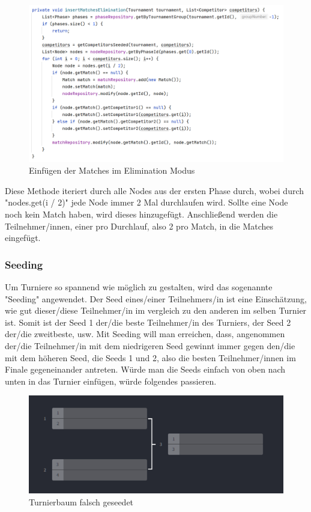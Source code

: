\begin{figure}[H]
    \includegraphics[scale=0.48]{pics/backend/elimination/elimination_insertMatches.png}
    \caption{Einfügen der Matches im Elimination Modus}
\end{figure}

Diese Methode iteriert durch alle Nodes aus der ersten Phase durch, wobei durch "nodes.get(i / 2)" jede Node immer 2 Mal durchlaufen wird. 
Sollte eine Node noch kein Match haben, wird dieses hinzugefügt. Anschließend werden die Teilnehmer/innen, einer pro Durchlauf, also 2 pro Match, 
in die Matches eingefügt. 

\subsubsection{Seeding}

Um Turniere so spannend wie möglich zu gestalten, wird das sogenannte "Seeding" angewendet. Der Seed eines/einer Teilnehmers/in ist eine Einschätzung, wie gut dieser/diese Teilnehmer/in im vergleich zu den anderen im selben Turnier
ist. Somit ist der Seed 1 der/die beste Teilnehmer/in des Turniers, der Seed 2 der/die zweitbeste, usw. Mit Seeding will man erreichen, dass, angenommen der/die Teilnehmer/in mit dem niedrigeren Seed gewinnt immer gegen den/die 
mit dem höheren Seed, die Seeds 1 und 2, also die besten Teilnehmer/innen im Finale gegeneinander antreten. Würde man die Seeds einfach von oben nach unten in das Turnier einfügen, würde folgendes passieren.


\begin{figure}[H]
    \includegraphics[scale=0.33]{pics/backend/elimination/elimination_tree_seeded_wrong.png}
    \caption{Turnierbaum falsch geseedet\cite{implementation-execution-1}}
\end{figure}

